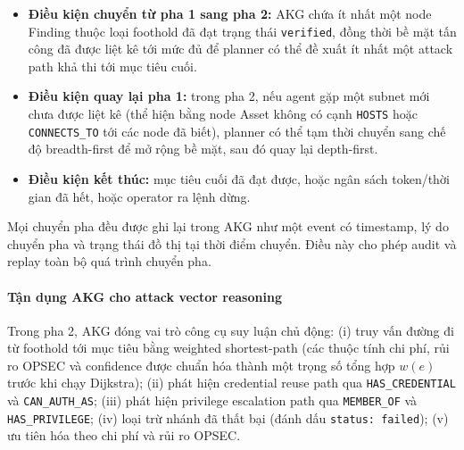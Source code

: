 \begin{itemize}
    \item \textbf{Điều kiện chuyển từ pha 1 sang pha 2:} AKG chứa ít nhất một node Finding thuộc loại foothold đã đạt trạng thái \texttt{verified}, đồng thời bề mặt tấn công đã được liệt kê tới mức đủ để planner có thể đề xuất ít nhất một attack path khả thi tới mục tiêu cuối.
    \item \textbf{Điều kiện quay lại pha 1:} trong pha 2, nếu agent gặp một subnet mới chưa được liệt kê (thể hiện bằng node Asset không có cạnh \texttt{HOSTS} hoặc \texttt{CONNECTS\_TO} tới các node đã biết), planner có thể tạm thời chuyển sang chế độ breadth-first để mở rộng bề mặt, sau đó quay lại depth-first.
    \item \textbf{Điều kiện kết thúc:} mục tiêu cuối đã đạt được, hoặc ngân sách token/thời gian đã hết, hoặc operator ra lệnh dừng.
\end{itemize}

Mọi chuyển pha đều được ghi lại trong AKG như một event có timestamp, lý do chuyển pha và trạng thái đồ thị tại thời điểm chuyển. Điều này cho phép audit và replay toàn bộ quá trình chuyển pha.

\paragraph{Tận dụng AKG cho attack vector reasoning}

Trong pha 2, AKG đóng vai trò công cụ suy luận chủ động: (i) truy vấn đường đi từ foothold tới mục tiêu bằng weighted shortest-path (các thuộc tính chi phí, rủi ro OPSEC và confidence được chuẩn hóa thành một trọng số tổng hợp $w(e)$ trước khi chạy Dijkstra); (ii) phát hiện credential reuse path qua \texttt{HAS\_CREDENTIAL} và \texttt{CAN\_AUTH\_AS}; (iii) phát hiện privilege escalation path qua \texttt{MEMBER\_OF} và \texttt{HAS\_PRIVILEGE}; (iv) loại trừ nhánh đã thất bại (đánh dấu \texttt{status: failed}); (v) ưu tiên hóa theo chi phí và rủi ro OPSEC.

